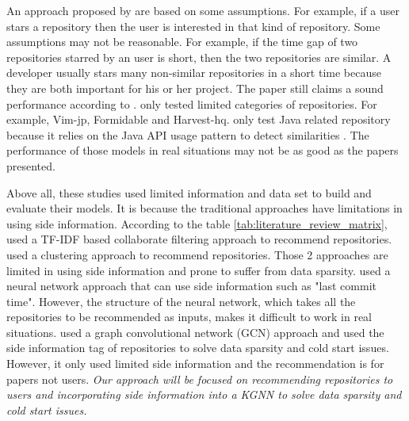 \documentclass[11pt,twoside]{report}
\begin{document}
An approach proposed by \cite{zhang_detecting_2017} are based on some assumptions. For example, if a user stars a repository then the user is interested in that kind of repository. Some assumptions may not be reasonable. For example, if the time gap of two repositories starred by an user is short, then the two repositories are similar. A developer usually stars many non-similar repositories in a short time because they are both important for his or her project. The paper still claims a sound performance according to \cite{zhang_detecting_2017}. \cite{xu_repersp_2017, sun_personalized_2018, zhang_detecting_2017} only tested limited categories of repositories. For example, Vim-jp, Formidable and Harvest-hq. \cite{sun_personalized_2018} only test Java related repository because it relies on the Java API usage pattern to detect similarities \cite{zhang_detecting_2017}. The performance of those models in real situations may not be as good as the papers presented.

Above all, these studies used limited information and data set to build and evaluate their models. It is because the traditional approaches have limitations in using side information. According to the table \ref{tab:literature_review_matrix}, \cite{zhang_detecting_2017,inka_open_2018,xu_repersp_2017,sun_personalized_2018} used a TF-IDF based collaborate filtering approach to recommend repositories. \cite{guendouz_recommending_2015} used a clustering approach to recommend repositories. Those 2 approaches are limited in using side information and prone to suffer from data sparsity. \cite{liu_recommending_2018} used a neural network approach that can use side information such as "last commit time". However, the structure of the neural network, which takes all the repositories to be recommended as inputs, makes it difficult to work in real situations. \cite{shao_paper2repo_2020} used a graph convolutional network (GCN) approach and used the side information tag of repositories to solve data sparsity and cold start issues. However, it only 
used limited side information and the recommendation is for papers not users. \textit{Our approach will be focused on recommending repositories to users and incorporating side information into a KGNN to solve data sparsity and cold start issues.}
\end{document}
